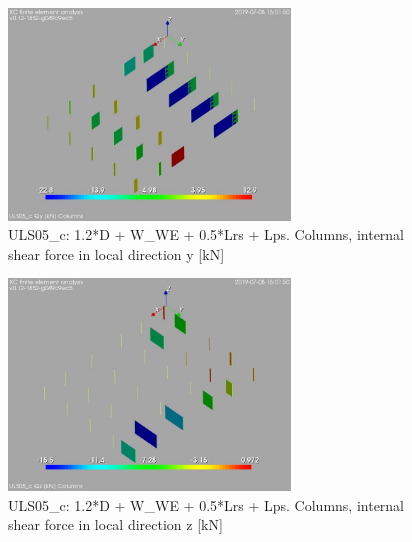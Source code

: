 \begin{figure}
\begin{center}
\includegraphics[width=75mm]{annex_res_columns/graphics/resSimplLC/ULS05_ccolumnsQy}
\caption{ULS05\_c: 1.2*D + W\_WE + 0.5*Lrs + Lps. Columns, internal shear force in local direction y [kN]}
\end{center}
\end{figure}
\begin{figure}
\begin{center}
\includegraphics[width=75mm]{annex_res_columns/graphics/resSimplLC/ULS05_ccolumnsQz}
\caption{ULS05\_c: 1.2*D + W\_WE + 0.5*Lrs + Lps. Columns, internal shear force in local direction z [kN]}
\end{center}
\end{figure}

